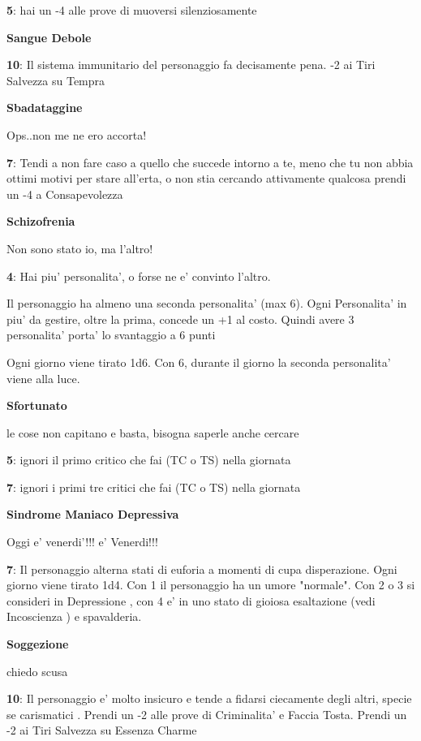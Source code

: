 \documentclass[a4paper,11pt,twoside,openany]{book}
\begin{document}
{\textbf{5}: hai un -4 alle prove di muoversi silenziosamente

\textbf{Sangue Debole}

\textbf{10}: Il sistema immunitario del personaggio fa decisamente pena. -2 ai Tiri Salvezza su Tempra

\textbf{Sbadataggine}

Ops..non me ne ero accorta!

\textbf{7}: Tendi a non fare caso a quello che succede intorno a te, meno che tu non abbia ottimi motivi per stare all'erta, o non stia cercando attivamente qualcosa prendi un -4 a Consapevolezza

\textbf{Schizofrenia}

Non sono stato io, ma l'altro!

\textbf{4}: Hai piu' personalita', o forse ne e' convinto l'altro.

Il personaggio ha almeno una seconda personalita' (max 6).
Ogni Personalita' in piu' da gestire, oltre la prima, concede un +1 al costo.
Quindi avere 3 personalita' porta' lo svantaggio a 6 punti

Ogni giorno viene tirato 1d6. Con 6, durante il giorno la seconda personalita' viene alla luce.

\textbf{Sfortunato}

le cose non capitano e basta, bisogna saperle anche cercare

\textbf{5}: ignori il primo critico che fai (TC o TS) nella giornata

\textbf{7}: ignori i primi tre critici che fai (TC o TS) nella giornata

\textbf{Sindrome Maniaco Depressiva}

Oggi e' venerdi'!!! e' Venerdi!!!

\textbf{7}: Il personaggio alterna stati di euforia a momenti di cupa disperazione. Ogni giorno viene tirato 1d4. Con 1 il personaggio ha un umore "normale". Con 2 o 3 si consideri in Depressione , con 4 e' in uno stato di gioiosa esaltazione (vedi Incoscienza ) e spavalderia.

\textbf{Soggezione}

chiedo scusa

\textbf{10}: Il personaggio e' molto insicuro e tende a fidarsi ciecamente degli altri, specie se carismatici . Prendi un -2 alle prove di Criminalita' e Faccia Tosta.
Prendi un -2 ai Tiri Salvezza su Essenza Charme

}
\end{document}
